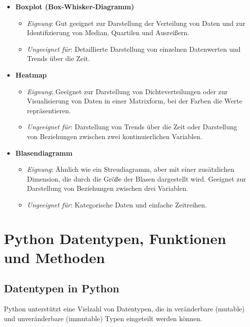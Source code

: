 \documentclass[11pt, oneside]{book}
\begin{document}
\begin{itemize}
    \item \textbf{Boxplot (Box-Whisker-Diagramm)}
    \begin{itemize}
        \item \textit{Eignung}: Gut geeignet zur Darstellung der Verteilung von Daten und zur Identifizierung von Median, Quartilen und Ausreißern.
        \item \textit{Ungeeignet für}: Detaillierte Darstellung von einzelnen Datenwerten und Trends über die Zeit.
    \end{itemize}
    
    \item \textbf{Heatmap}
    \begin{itemize}
        \item \textit{Eignung}: Geeignet zur Darstellung von Dichteverteilungen oder zur Visualisierung von Daten in einer Matrixform, bei der Farben die Werte repräsentieren.
        \item \textit{Ungeeignet für}: Darstellung von Trends über die Zeit oder Darstellung von Beziehungen zwischen zwei kontinuierlichen Variablen.
    \end{itemize}
    
    \item \textbf{Blasendiagramm}
    \begin{itemize}
        \item \textit{Eignung}: Ähnlich wie ein Streudiagramm, aber mit einer zusätzlichen Dimension, die durch die Größe der Blasen dargestellt wird. Geeignet zur Darstellung von Beziehungen zwischen drei Variablen.
        \item \textit{Ungeeignet für}: Kategorische Daten und einfache Zeitreihen.
    \end{itemize}
\end{itemize}




\chapter{Python Datentypen, Funktionen und Methoden}

\section{Datentypen in Python}

Python unterstützt eine Vielzahl von Datentypen, die in veränderbare (mutable) und unveränderbare (immutable) Typen eingeteilt werden können.
\end{document}
